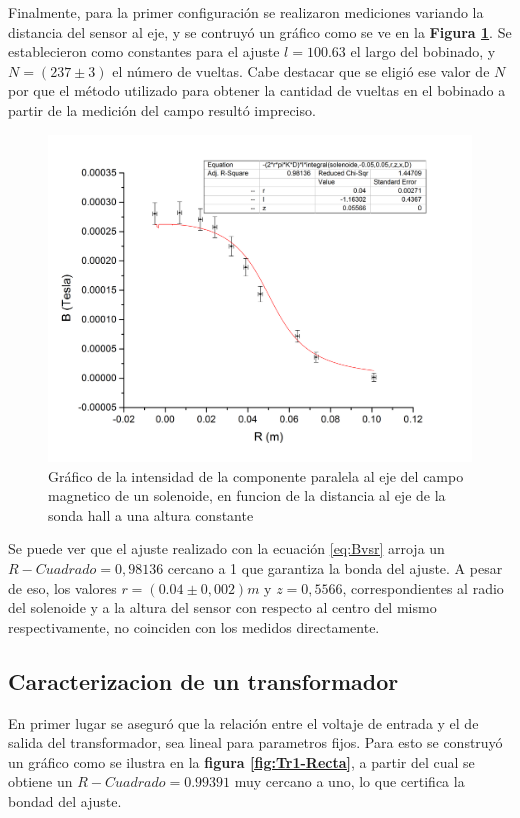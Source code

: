 \documentclass[11pt,a4paper]{article}
\begin{document}
Finalmente, para la primer configuración se realizaron mediciones variando la distancia del sensor al eje, y se contruyó un gráfico como se ve en la \textbf{Figura \ref{fig:B-vs-R}}. Se establecieron como constantes para el ajuste $l= 100.63 $ el largo del bobinado, y $N = (237 \pm 3)$ el número de vueltas. Cabe destacar que se eligió ese valor de $N$ por que el método utilizado para obtener la cantidad de vueltas en el bobinado a partir de la medición del campo resultó impreciso.

\begin{figure}[H]
	\centering
	\includegraphics[scale=0.45]{Campo-vs-Radio}
	\caption{Gráfico de la intensidad de la componente paralela al eje del campo magnetico de un solenoide, en funcion de la distancia al eje de la sonda hall a una altura constante }
   \label{fig:B-vs-R}
\end{figure}

Se puede ver que el ajuste realizado con la ecuación \eqref{eq:Bvsr} arroja un $R-Cuadrado = 0,98136$ cercano a 1 que garantiza la bonda del ajuste. A pesar de eso, los valores $r=(0.04 \pm 0,002)m$ y $z = 0,5566$, correspondientes al radio del solenoide y a la altura del sensor con respecto al centro del mismo respectivamente, no coinciden con los medidos directamente. 

\subsection{Caracterizacion de un transformador}

En primer lugar se aseguró que la relación entre el voltaje de entrada y el de salida del transformador, sea lineal para parametros fijos. Para esto se construyó un gráfico como se ilustra en la \textbf{figura \ref{fig:Tr1-Recta}}, a partir del cual se obtiene un $R-Cuadrado = 0.99391$ muy cercano a uno, lo que certifica la bondad del ajuste.
\end{document}
